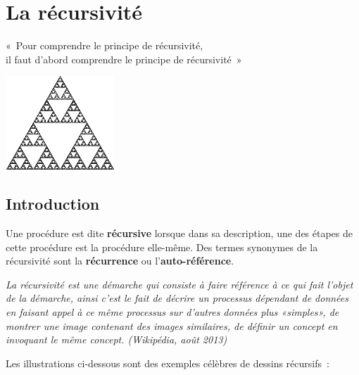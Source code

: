 \chapter{La récursivité}

«~Pour comprendre le principe de récursivité, \\
il faut d'abord comprendre le principe de récursivité~»

\begin{center}
	\includegraphics[width=4.094cm,height=3.519cm]{image/a2012Logique2eme-img015.png}
\end{center}
	

\section{Introduction}
	
	Une procédure est dite \textbf{récursive} lorsque dans sa description, 
	une des étapes de cette procédure est la procédure elle-même. 
	Des termes synonymes de la récursivité sont la \textbf{récurrence} 
	ou l'\textbf{auto-référence}.
	
	\textit{La récursivité est une démarche qui consiste à faire 
	référence à ce qui fait l'objet de la démarche, ainsi c'est
	le fait de décrire un processus dépendant de données en faisant 
	appel à ce même processus sur d'autres données plus
	«simples», de montrer une image contenant des images similaires, 
	de définir un concept en invoquant le même concept.
	(Wikipédia, août 2013)}

	Les illustrations ci-dessous sont des exemples célèbres 
	de dessins récursifs~:


